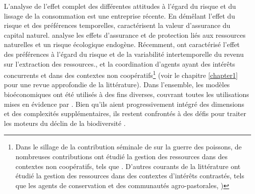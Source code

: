 {L'analyse de l'effet complet des différentes attitudes à l'égard du risque et du lissage de la consommation est une entreprise récente. En démêlant l'effet du risque et des préférences temporelles, \cite{quaas_2019_insurance, AugeraudVeron2019} caractérisent la valeur d'assurance du capital naturel. \cite{berry_2019} analyse les effets d'assurance et de protection liés aux ressources naturelles et un risque écologique endogène. Récemment, \cite{KELSALL2023102855} ont caractérisé l'effet des préférences à l'égard du risque et de la variabilité intertemporelle du revenu sur l'extraction des ressources.}, et la coordination d'agents ayant des intérêts concurrents et dans des contextes non coopératifs\footnote{Dans le sillage de la contribution séminale de \cite{levhari_great_1980} sur la guerre des poissons, de nombreuses contributions ont étudié la gestion des ressources dans des contextes non coopératifs, tels que \cite{janmaat_sharing_2005, kaffine_unitization_2010, costello_partial_2015, costello_private_2017}. D'autres courants de la littérature ont étudié la gestion des ressources dans des contextes d'intérêts contrastés, tels que les agents de conservation et des communautés agro-pastorales, \cite{Skonhoft1998, })} (voir le chapitre \ref{chapter1} pour une revue approfondie de la littérature). 
Dans l'ensemble, les modèles bioéconomiques ont été utilisés à des fins diverses, couvrant toutes les utilisations mises en évidence par \cite{varenne_epistemologie_2014} . Bien qu'ils aient progressivement intégré des dimensions et des complexités supplémentaires, ils restent confrontés à des défis pour traiter les moteurs du déclin de la biodiversité \citep{Drechsler20200}.


